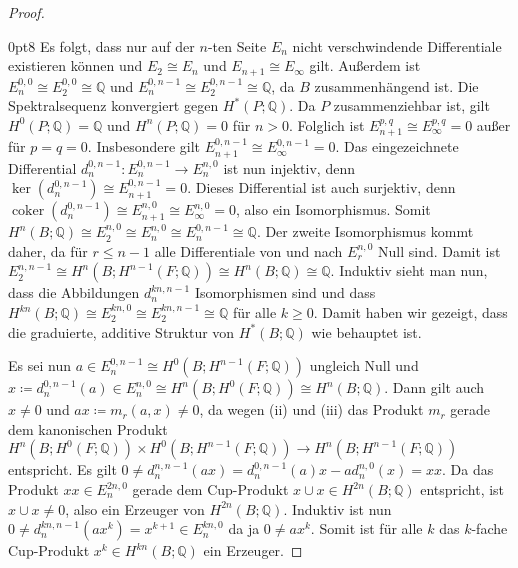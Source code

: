 \documentclass[11pt, a4paper, german]{article}
\theoremstyle{definition}
\theoremstyle{remark}
\newcommand{\Q}{\mathbb{Q}} %
\DeclareMathOperator{\coker}{coker} %
\begin{document}
\begin{proof}
\begin{cutout}{0}{\dimexpr\linewidth-8cm\relax}{0pt}{8}
    Es folgt, dass nur auf der $n$-ten Seite $E_n$ nicht verschwindende Differentiale existieren können und $E_2 \cong E_n$ und $E_{n+1} \cong E_\infty$ gilt.
    Außerdem ist $E_n^{0,0} \cong E_2^{0,0} \cong \Q$ und $E_n^{0,n-1} \cong E_2^{0,n-1} \cong \Q$, da $B$ zusammenhängend ist.
    Die Spektralsequenz konvergiert gegen $H^*(P; \Q)$.
    Da $P$ zusammenziehbar ist, gilt $H^0(P; \Q) = \Q$ und $H^n(P; \Q) = 0$ für $n > 0$.
    Folglich ist $E_{n+1}^{p,q} \cong E_\infty^{p,q} = 0$ außer für $p = q = 0$.
    Insbesondere gilt $E_{n+1}^{0,n-1} \cong E_\infty^{0,n-1} = 0$.
    Das eingezeichnete Differential $d_n^{0,n-1} : E_n^{0,n-1} \to E_n^{n,0}$ ist nun injektiv, denn $\ker(d_n^{0,n-1}) \cong E_{n+1}^{0,n-1} = 0$.
    Dieses Differential ist auch surjektiv, denn $\coker(d_n^{0,n-1}) \cong E_{n+1}^{n,0} \cong E_\infty^{n,0} = 0$, also ein Isomorphismus.
    Somit $H^n(B; \Q) \cong E_2^{n,0} \cong E_n^{n,0} \cong E_n^{0,n-1} \cong \Q$.
    Der zweite Isomorphismus kommt daher, da für $r \leq n-1$ alle Differentiale von und nach $E_r^{n,0}$ Null sind. %
    Damit ist $E_2^{n,n-1} \cong H^{n}(B; H^{n-1}(F; \Q)) \cong H^{n}(B; \Q) \cong \Q$.
    Induktiv sieht man nun, dass die Abbildungen $d_n^{kn,n-1}$ Isomorphismen sind und dass $H^{kn}(B; \Q) \cong E_2^{kn,0} \cong  E_2^{kn,n-1} \cong \Q$ für alle $k \geq 0$.
    Damit haben wir gezeigt, dass die graduierte, additive Struktur von $H^*(B; \Q)$ wie behauptet ist.
  \end{cutout}
  Es sei nun $a \in E_n^{0,n-1} \cong H^0(B; H^{n-1}(F; \Q))$ ungleich Null und $x \coloneqq d_n^{0,n-1}(a) \in E_n^{n,0} \cong H^n(B; H^0(F; \Q)) \cong H^n(B; \Q)$.
  Dann gilt auch $x \neq 0$ und $ax \coloneqq m_r(a, x) \neq 0$, da wegen (ii) und (iii) das Produkt $m_r$ gerade dem kanonischen Produkt $H^n(B; H^0(F; \Q)) \times H^0(B; H^{n-1}(F; \Q)) \to H^n(B; H^{n-1}(F; \Q))$ entspricht. %
  Es gilt
  $0 \neq d_n^{n,n-1}(ax) = d_n^{0,n-1}(a)x - a d_n^{n,0}(x) = xx$.
  Da das Produkt $xx \in E_n^{2n,0}$ gerade dem Cup-Produkt $x \cup x \in H^{2n}(B; \Q)$ entspricht, ist $x \cup x \neq 0$, also ein Erzeuger von $H^{2n}(B; \Q)$.
  Induktiv ist nun $0 \neq d_n^{kn,n-1}(a x^k) = x^{k+1} \in E_n^{kn,0}$ da ja $0 \neq a x^k$.
  Somit ist für alle $k$ das $k$-fache Cup-Produkt $x^k \in H^{kn}(B; \Q)$ ein Erzeuger.


\end{proof}
\end{document}
